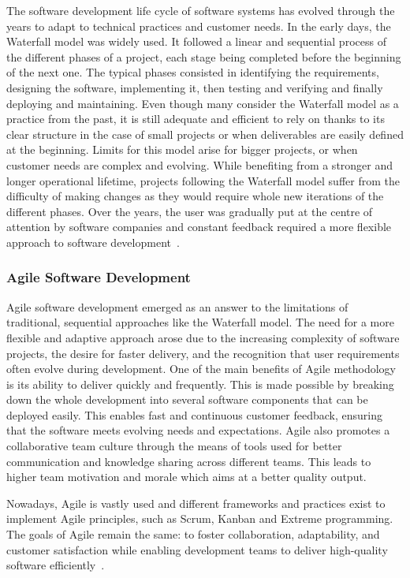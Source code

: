 The software development life cycle of software systems has evolved through the years to adapt to technical practices and customer needs.
In the early days, the Waterfall model was widely used. It followed a linear and sequential process of the different phases of a project, each stage being completed before the beginning of the next one. The typical phases consisted in identifying the requirements, designing the software, implementing it, then testing and verifying and finally deploying and maintaining. Even though many consider the Waterfall model as a practice from the past, it is still adequate and efficient to rely on thanks to its clear structure in the case of small projects or when deliverables are easily defined at the beginning. Limits for this model arise for bigger projects, or when customer needs are complex and evolving. While benefiting from a stronger and longer operational lifetime, projects following the Waterfall model suffer from the difficulty of making changes as they would require whole new iterations of the different phases. Over the years, the user was gradually put at the centre of attention by software companies and constant feedback required a more flexible approach to software development~\cite{leau2012software,jain2015systematic,bhuvaneswari2013survey}.

\subsubsection{Agile Software Development}

Agile software development emerged as an answer to the limitations of traditional, sequential approaches like the Waterfall model. The need for a more flexible and adaptive approach arose due to the increasing complexity of software projects, the desire for faster delivery, and the recognition that user requirements often evolve during development.
One of the main benefits of Agile methodology is its ability to deliver quickly and frequently. This is made possible by breaking down the whole development into several software components that can be deployed easily. This enables fast and continuous customer feedback, ensuring that the software meets evolving needs and expectations. Agile also promotes a collaborative team culture through the means of tools used for better communication and knowledge sharing across different teams. 
This leads to higher team motivation and morale which aims at a better quality output.

Nowadays, Agile is vastly used and different frameworks and practices exist to implement Agile principles, such as Scrum, Kanban and Extreme programming. The goals of Agile remain the same: to foster collaboration, adaptability, and customer satisfaction while enabling development teams to deliver high-quality software efficiently~\cite{dyba2009we,koch2004agile,abrahamsson2017agile,beck2001manifesto}.

